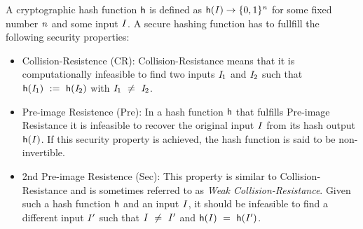 \begin{definition}\label{def:hashFunction}
    A cryptographic hash function $\mathsf{h}$ is defined as $\mathsf{h} (\mathit{I}) \rightarrow \{0,1\}^{\mathit{n}}$ for some fixed number $\mathit{n}$ and some input $\mathit{I}$. A secure hashing function
    has to fullfill the following security properties:~\cite{al2011cryptographic}
    \begin{itemize}
        \item Collision-Resistence (CR): Collision-Resistance means that it is computationally infeasible to find two inputs $\mathit{I}_1$ and $\mathit{I}_2$ such that
        $\mathsf{h} (\mathit{I}_1) ~:=~ \mathsf{h} (\mathit{I}_2)$ with $\mathit{I}_1 ~\neq~ \mathit{I}_2$.
        \item Pre-image Resistence (Pre): In a hash function $\mathsf{h}$ that fulfills Pre-image Resistance it is infeasible to recover the original input $\mathit{I}$ from its hash output $\mathsf{h} (\mathit{I})$.
        If this security property is achieved, the hash function is said to be non-invertible.
        \item 2nd Pre-image Resistence (Sec):  This property is similar to Collision-Resistance and is sometimes referred to as \textit{Weak Collision-Resistance}.
        Given such a hash function $\mathsf{h}$ and an input $\mathit{I}$, it should be infeasible to find a different input $\mathit{I}'$ such that $\mathit{I} ~\neq~ \mathit{I}'$
        and $\mathsf{h} (\mathit{I}) ~=~ \mathsf{h} (\mathit{I}')$.
    \end{itemize}
\end{definition}

